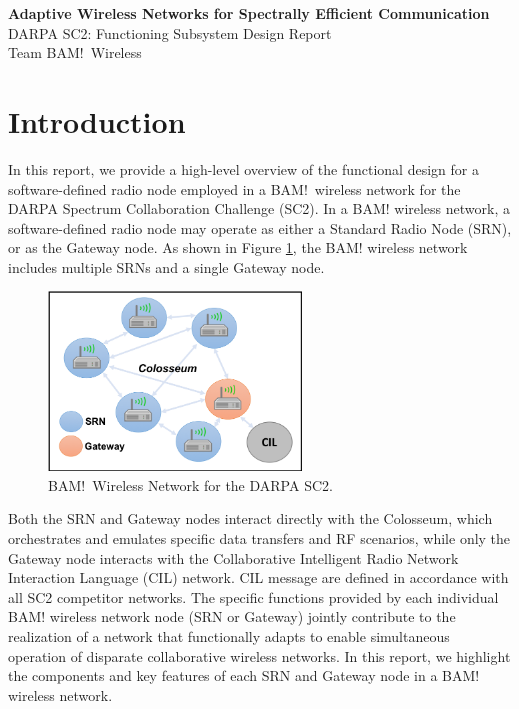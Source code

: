 \documentclass[11pt]{article}
\begin{document}
\begin{center}
\textbf{\Large Adaptive Wireless Networks for Spectrally Efficient Communication} \\[0.1in]
\Large DARPA SC2: Functioning Subsystem Design Report \\
Team BAM!\ Wireless
\end{center}

 \section{Introduction}
 In this report, we provide a high-level overview of the functional design for a software-defined radio node employed in a BAM!\ wireless network for the DARPA Spectrum Collaboration Challenge (SC2).  In a BAM! wireless network, a software-defined radio node may operate as either a Standard Radio Node (SRN), or as the Gateway node.  As shown in Figure \ref{fg:BAM-SYS-BD}, the BAM! wireless network includes multiple SRNs and a single Gateway node.  
 \begin{figure} [htb]
 \centerline{
 \includegraphics[width = 0.6\textwidth]{Figures/SysBD.png}}
 \caption{BAM!\ Wireless Network for the DARPA SC2.} 
 \label{fg:BAM-SYS-BD}
 \end{figure} 
 Both the SRN and Gateway nodes interact directly with the Colosseum, which orchestrates and emulates specific data transfers and RF scenarios, while only the Gateway node interacts with the Collaborative Intelligent Radio Network Interaction Language (CIL) network. CIL message are defined in accordance with all SC2 competitor networks.  The specific functions provided by each individual BAM! wireless network node (SRN or Gateway) jointly contribute to the realization of a network that functionally adapts to enable simultaneous operation of disparate collaborative wireless networks.  In this report, we highlight the components and key features of each SRN and Gateway node in a BAM! wireless network.
 
\end{document}
